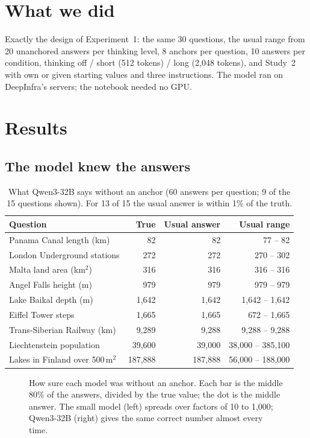 \documentclass[11pt,a4paper]{article}
\begin{document}
\section{What we did}
Exactly the design of Experiment~1: the same 30 questions, the usual range from 20 unanchored answers per thinking level, 8 anchors per question, 10 answers per condition, thinking off / short (512 tokens) / long (2,048 tokens), and Study~2 with own or given starting values and three instructions. The model ran on DeepInfra's servers; the notebook needed no GPU.

\section{Results}

\subsection{The model knew the answers}

\begin{table}[ht]
\centering\small
\begin{tabular}{@{}lrrr@{}}
\toprule
Question & True & Usual answer & Usual range \\
\midrule
Panama Canal length (km) & 82 & 82 & 77 -- 82 \\
London Underground stations & 272 & 272 & 270 -- 302 \\
Malta land area (km$^2$) & 316 & 316 & 316 -- 316 \\
Angel Falls height (m) & 979 & 979 & 979 -- 979 \\
Lake Baikal depth (m) & 1,642 & 1,642 & 1,642 -- 1,642 \\
Eiffel Tower steps & 1,665 & 1,665 & 672 -- 1,665 \\
Trans-Siberian Railway (km) & 9,289 & 9,288 & 9,288 -- 9,288 \\
Liechtenstein population & 39,600 & 39,000 & 38,000 -- 385,100 \\
Lakes in Finland over 500\,m$^2$ & 187,888 & 187,888 & 56,000 -- 188,000 \\
\bottomrule
\end{tabular}
\caption{What Qwen3-32B says without an anchor (60 answers per question; 9 of the 15 questions shown). For 13 of 15 the usual answer is within 1\% of the truth.}
\label{tab:knowledge}
\end{table}

\begin{figure}[ht]
\centering{}
\caption{How sure each model was without an anchor. Each bar is the middle 80\% of the answers, divided by the true value; the dot is the middle answer. The small model (left) spreads over factors of 10 to 1,000; Qwen3-32B (right) gives the same correct number almost every time.}
\label{fig:sure}
\end{figure}
\end{document}
